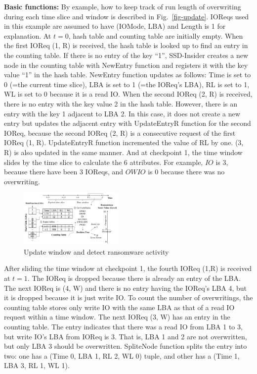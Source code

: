 \documentclass[conference]{IEEEtran}
\newcommand{\ours}{SSD-Insider}
\begin{document}
{\bf\noindent Basic functions:} By example, how to keep track of run length of 
overwriting during each time slice and window is described in Fig.~\ref{fig-update}.  
IOReqs used in this example are assumed to have (IOMode, LBA) and Length is 1
for explanation. 
At $t=0$, hash table and counting table are initially empty.
When the first IOReq (1, R) is received, the hash table is looked up to find an entry 
in the counting table. If there is no entry of the key ``1'', \ours{} creates
a new node in the counting table with NewEntry function and registers it with the 
key value ``1'' in the hash table. NewEntry function updates as follows: Time is set to 0 
(=the current time slice), LBA is set to 1 (=the IOReq's LBA), RL is set to 1,
WL is set to 0 because it is a read IO. When the second IOReq (2, R) is received, 
there is no entry with the key value 2 in the hash table. However, there is 
an entry with the key 1 adjacent to LBA 2. In this case, it does not create 
a new entry but updates the adjacent entry with UpdateEntryR function for the second IOReq,
because the second IOReq (2, R) is a consecutive request of the first IOReq (1, R).
UpdateEntryR function incremented the value of RL by one. (3, R) is also updated 
in the same manner. And at checkpoint 1, the time window slides by the time slice 
to calculate the 6 attributes. 
For example, $IO$ is 3, because there have been 3 IOReqs, 
and $OWIO$ is 0 because there was no overwriting. 

\begin{figure}
	\includegraphics[width=0.45\textwidth]{fig/windowupdate.png}
	\caption{Update window and detect ransomware activity}\label{fig-sw}
\end{figure}
After sliding the time window at checkpoint 1, the fourth IOReq (1,R) is received at 
$t=1$. The IOReq is dropped because there is already an entry of the LBA. 
The next IOReq is (4, W) and there is no entry having the IOReq's LBA 4, 
but it is dropped because it is just write IO. 
To count the number of overwritings, the counting table stores only write IO with the same LBA 
as that of a read IO request within a time window. The next IOReq (3, W) has an entry 
in the counting table. The entry indicates that there was a read IO from LBA 1 to 3, 
but write IO's LBA from IOReq is 3. 
 That is, LBA 1 and 2 are not overwritten, but only LBA 3 should be overwritten.
SpliteNode function splits the entry into two: one has a (Time 0, LBA 1, RL 2, WL 0) tuple,
and other has a (Time 1, LBA 3, RL 1, WL 1). 
\end{document}

